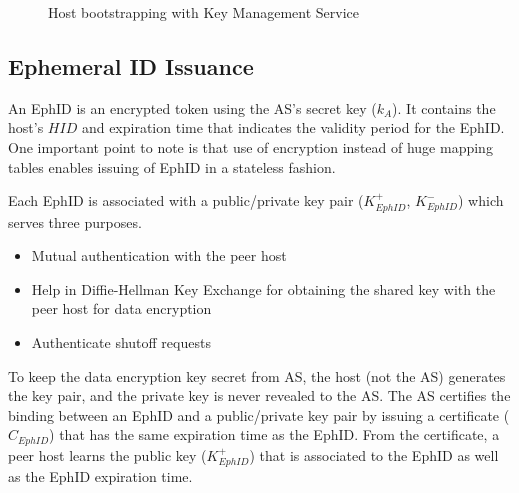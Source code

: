 \begin{figure}[th!!]
\centering
\noindent
{}
\decoRule
\caption[Host Bootstrapping]{Host bootstrapping with Key Management Service}
\label{fig:perf_dns}
\end{figure}

\subsection{Ephemeral ID Issuance}
An EphID is an encrypted token using the AS's secret key ($k_A$). It contains the host's $HID$ and expiration time that indicates the validity period for the EphID. One important point to note is that use of encryption instead of huge mapping tables enables issuing of EphID in a stateless fashion.

Each EphID is associated with a public/private key pair ($K^{+}_{EphID}$, $K^{-}_{EphID}$) which serves three purposes.
\begin{itemize}
    \item Mutual authentication with the peer host
    \item Help in Diffie-Hellman Key Exchange for obtaining the shared key with the peer host for data encryption
    \item Authenticate shutoff requests
\end{itemize}

To keep the data encryption key secret from AS, the host (not the AS) generates the key pair, and the private key is never revealed to the AS. The AS certifies the binding between an EphID and a public/private key pair by issuing a certificate ($C_{EphID}$) that has the same expiration time as the EphID. From the certificate, a peer host learns the public key ($K^{+}_{EphID}$) that is associated to the EphID as well as the EphID expiration time.

